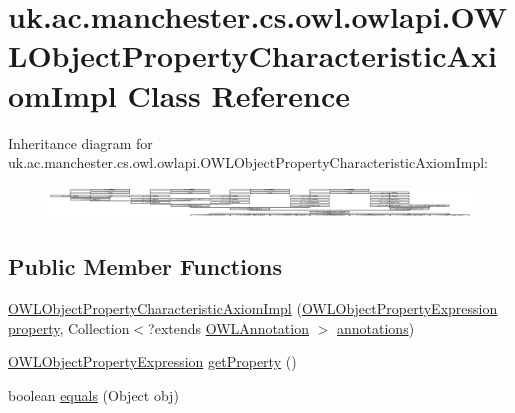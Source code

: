 \hypertarget{classuk_1_1ac_1_1manchester_1_1cs_1_1owl_1_1owlapi_1_1_o_w_l_object_property_characteristic_axiom_impl}{\section{uk.\-ac.\-manchester.\-cs.\-owl.\-owlapi.\-O\-W\-L\-Object\-Property\-Characteristic\-Axiom\-Impl Class Reference}
\label{classuk_1_1ac_1_1manchester_1_1cs_1_1owl_1_1owlapi_1_1_o_w_l_object_property_characteristic_axiom_impl}
}
Inheritance diagram for uk.\-ac.\-manchester.\-cs.\-owl.\-owlapi.\-O\-W\-L\-Object\-Property\-Characteristic\-Axiom\-Impl\-:\begin{figure}[H]
\begin{center}
\leavevmode
\includegraphics[height=0.834575cm]{classuk_1_1ac_1_1manchester_1_1cs_1_1owl_1_1owlapi_1_1_o_w_l_object_property_characteristic_axiom_impl}
\end{center}
\end{figure}
\subsection*{Public Member Functions}
\begin{DoxyCompactItemize}
\item 
\hyperlink{classuk_1_1ac_1_1manchester_1_1cs_1_1owl_1_1owlapi_1_1_o_w_l_object_property_characteristic_axiom_impl_a9dbd05f216b893b51b3190c197e131c1}{O\-W\-L\-Object\-Property\-Characteristic\-Axiom\-Impl} (\hyperlink{interfaceorg_1_1semanticweb_1_1owlapi_1_1model_1_1_o_w_l_object_property_expression}{O\-W\-L\-Object\-Property\-Expression} \hyperlink{classuk_1_1ac_1_1manchester_1_1cs_1_1owl_1_1owlapi_1_1_o_w_l_object_property_characteristic_axiom_impl_ac99438140edc10b050c93559f367cdbb}{property}, Collection$<$?extends \hyperlink{interfaceorg_1_1semanticweb_1_1owlapi_1_1model_1_1_o_w_l_annotation}{O\-W\-L\-Annotation} $>$ \hyperlink{classuk_1_1ac_1_1manchester_1_1cs_1_1owl_1_1owlapi_1_1_o_w_l_axiom_impl_af6fbf6188f7bdcdc6bef5766feed695e}{annotations})
\item 
\hyperlink{interfaceorg_1_1semanticweb_1_1owlapi_1_1model_1_1_o_w_l_object_property_expression}{O\-W\-L\-Object\-Property\-Expression} \hyperlink{classuk_1_1ac_1_1manchester_1_1cs_1_1owl_1_1owlapi_1_1_o_w_l_object_property_characteristic_axiom_impl_ae98c5f4a53a3368ad675655a393a4f4c}{get\-Property} ()
\item 
boolean \hyperlink{classuk_1_1ac_1_1manchester_1_1cs_1_1owl_1_1owlapi_1_1_o_w_l_object_property_characteristic_axiom_impl_a5232109798f32b704a09a816c10dfb98}{equals} (Object obj)
\end{DoxyCompactItemize}
